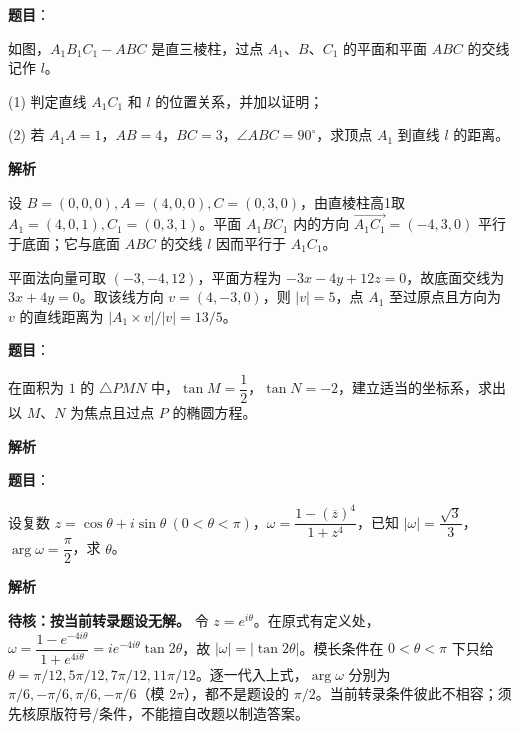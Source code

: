 \begin{answer}

\textbf{题目}：

如图，$A_1B_1C_1-ABC$ 是直三棱柱，过点 $A_1\text{、}B\text{、}C_1$ 的平面和平面 $ABC$ 的交线记作 $l$。

(1) 判定直线 $A_1C_1$ 和 $l$ 的位置关系，并加以证明；

(2) 若 $A_1A=1$，$AB=4$，$BC=3$，$\angle ABC=90^\circ$，求顶点 $A_1$ 到直线 $l$ 的距离。
\nopagebreak[4]
\begin{center}\end{center}
\nopagebreak[4]
\textbf{解析}


设 $B=(0,0,0), A=(4,0,0), C=(0,3,0)$，由直棱柱高1取 $A_1=(4,0,1),C_1=(0,3,1)$。平面 $A_1BC_1$ 内的方向 $\overrightarrow{A_1C_1}=(-4,3,0)$ 平行于底面；它与底面 $ABC$ 的交线 $l$ 因而平行于 $A_1C_1$。


平面法向量可取 $(-3,-4,12)$，平面方程为 $-3x-4y+12z=0$，故底面交线为 $3x+4y=0$。取该线方向 $v=(4,-3,0)$，则 $|v|=5$，点 $A_1$ 至过原点且方向为 $v$ 的直线距离为 $|A_1\times v|/|v|=13/5$。



\end{answer}
\begin{answer}

\textbf{题目}：

在面积为 $1$ 的 $\triangle PMN$ 中，$\tan M=\dfrac12$，$\tan N=-2$，建立适当的坐标系，求出以 $M\text{、}N$ 为焦点且过点 $P$ 的椭圆方程。

\textbf{解析}


\end{answer}
\begin{answer}

\textbf{题目}：

设复数 $z=\cos\theta+i\sin\theta\ (0<\theta<\pi)$，$\omega=\dfrac{1-(\overline z)^4}{1+z^4}$，已知 $|\omega|=\dfrac{\sqrt3}{3}$，$\arg\omega=\dfrac\pi2$，求 $\theta$。

\textbf{解析}

\textbf{待核：按当前转录题设无解。} 令 $z=e^{i\theta}$。在原式有定义处，$\omega=\dfrac{1-e^{-4i\theta}}{1+e^{4i\theta}}=i e^{-4i\theta}\tan2\theta$，故 $|\omega|=|\tan2\theta|$。模长条件在 $0<\theta<\pi$ 下只给 $\theta=\pi/12,5\pi/12,7\pi/12,11\pi/12$。逐一代入上式，$\arg\omega$ 分别为 $\pi/6,-\pi/6,\pi/6,-\pi/6$（模 $2\pi$），都不是题设的 $\pi/2$。当前转录条件彼此不相容；须先核原版符号/条件，不能擅自改题以制造答案。


\end{answer}
